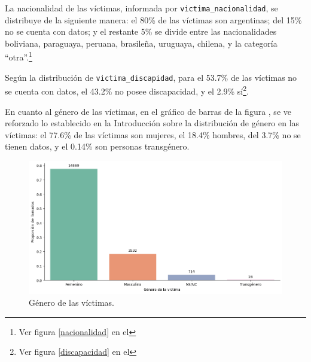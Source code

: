 \documentclass[10 pt]{article}
\begin{document}


La nacionalidad de las víctimas, informada por \texttt{victima\_nacionalidad}, se distribuye de la siguiente manera: el 80\% de las víctimas son argentinas; del 15\% no se cuenta con datos; y el restante 5\% se divide entre las nacionalidades boliviana, paraguaya, peruana, brasileña, uruguaya, chilena, y la categoría “otra”.\footnote{Ver figura \ref{nacionalidad} en el }


Según la distribución de \texttt{victima\_discapidad}, para el 53.7\% de las víctimas no se cuenta con datos, el 43.2\% no posee discapacidad, y el 2.9\% sí\footnote{Ver figura \ref{discapacidad} en el }. 


En cuanto al género de las víctimas, en el gráfico de barras de la figura , se ve reforzado lo establecido en la Introducción sobre la distribución de género en las víctimas: el 77.6\% de las víctimas son mujeres, el 18.4\% hombres, del 3.7\% no se tienen datos, y el 0.14\% son personas transgénero. 

\begin{figure}[H]
    \begin{center}
    \includegraphics[scale=.5]{images/latex_genero_victima.png}
    \caption{Género de las víctimas.}
    \label{genero}
    \end{center}
    \end{figure}
\end{document}
